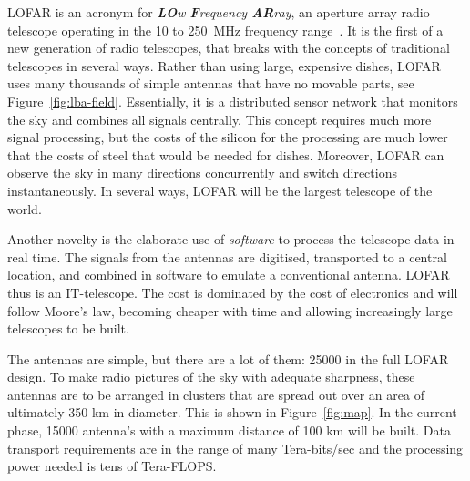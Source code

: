 \documentclass{article}
\newcommand{\longversion}[1]{}
\begin{document}
LOFAR is an acronym for \emph{\textbf{LO}w \textbf{F}requency
  \textbf{AR}ray}, an aperture array radio telescope operating in the
10 to 250~MHz frequency range~\cite{Butcher:04}.  It is the first of a new generation of
radio telescopes, that breaks with the concepts of traditional
telescopes in several ways.  Rather than using large, expensive
dishes, LOFAR uses many thousands of simple antennas that have no
movable parts, see
Figure~\ref{fig:lba-field}.  Essentially, it is a distributed sensor
network that monitors the sky and combines all signals centrally.
This concept requires much more signal processing, but the 
costs of the silicon for the processing are much lower that the costs of steel that would
be needed for dishes. Moreover, LOFAR can observe the sky in many
directions concurrently and switch directions instantaneously.  In
several ways, LOFAR will be the largest telescope of the world.

Another novelty is the elaborate
use of \emph{software\/} to process the telescope data in real time.
The signals from the
antennas are digitised, transported to a central location,
and combined in software to emulate a conventional antenna. 
LOFAR thus is an IT-telescope. 
The cost
is dominated by the cost of electronics and will follow Moore's law,
becoming cheaper with time and allowing increasingly large telescopes
to be built. 

The antennas are simple, but there are a lot of them: 25000 in the full LOFAR
design. To make radio pictures of the sky with adequate sharpness,
these antennas are to be arranged in clusters that are spread out over
an area of ultimately 350 km in diameter. This is shown in Figure~\ref{fig:map}.
In the current phase, 15000 
antenna's with a maximum distance of 100 km will
be built. Data transport requirements are in the range of many
Tera-bits/sec and the processing power needed is tens of Tera-FLOPS.

\longversion{
LOFAR will enable exciting new science cases.  First, we expect to see
the \emph{Epoch of Reionization\/} (EoR), the time that the first star
galaxies and quasars were formed. Second, LOFAR offers a unique
possibility in particle astrophysics for studying the origin of
high-energy \emph{cosmic rays}.  Third, LOFAR's ability to
continuously monitor a large fraction of the sky makes it uniquely
suited to find new \emph{pulsars} and to study \emph{transient
  sources}.  Since LOFAR has no moving parts, it can instantaneously
switch focus to some galactic event.  Fourth, \emph{Deep Extragalactic
  Surveys\/} will be carried out to find the most distant radio
galaxies and study star-forming galaxies.  Fifth, LOFAR will be
capable of observing the so far unexplored radio waves emitted by
\emph{cosmic magnetic fields}.  For a more extensive description of
the astronomical aspects of the LOFAR system, see De Bruyn
et.~al.~\cite{Bruyn:02}.
}
\end{document}
